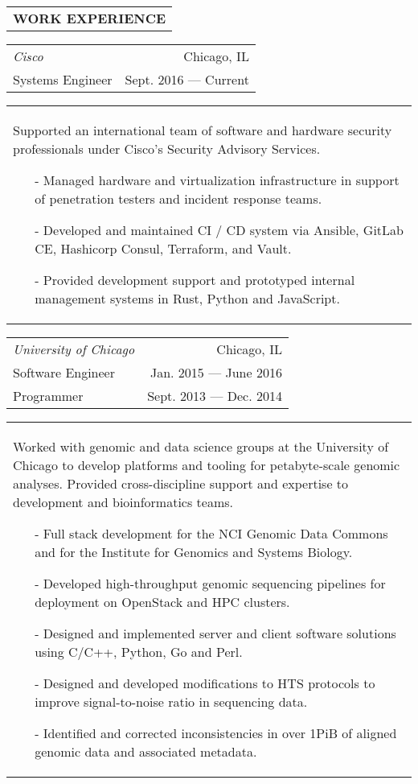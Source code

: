 \begin{tabularx}{\textwidth}{L}
    \textbf{WORK EXPERIENCE}
\end{tabularx}

\begin{tabularx}{\textwidth}{L R}
    \normalsize\textit{Cisco} & Chicago, IL \\
    Systems Engineer & Sept. 2016 --- Current \\
\end{tabularx}
\begin{tabularx}{\textwidth}{X}
    \vspace{1pt}
    Supported an international team of software and hardware security professionals under Cisco's Security Advisory Services.
    \begin{itemize}
        \itemsep{}
        \item[-] Managed hardware and virtualization infrastructure in support of penetration testers and incident response teams.
        \item[-] Developed and maintained CI / CD system via Ansible, GitLab CE, Hashicorp Consul, Terraform, and Vault.
        \item[-] Provided development support and prototyped internal management systems in Rust, Python and JavaScript.
    \end{itemize}
\end{tabularx}

\begin{tabularx}{\textwidth}{L R}
    \normalsize\textit{University of Chicago} & Chicago, IL \\
    Software Engineer & Jan. 2015 --- June 2016 \\
    Programmer & Sept. 2013 --- Dec. 2014 \\
\end{tabularx}
\begin{tabularx}{\textwidth}{X}
    \vspace{1pt}
    Worked with genomic and data science groups at the University of Chicago to develop platforms and tooling for petabyte-scale genomic analyses. Provided cross-discipline support and expertise to development and bioinformatics teams.
    \begin{itemize}
        \itemsep{}
        \item[-] Full stack development for the NCI Genomic Data Commons and for the Institute for Genomics and Systems Biology.
        \item[-] Developed high-throughput genomic sequencing pipelines for deployment on OpenStack and HPC clusters.
        \item[-] Designed and implemented server and client software solutions using C/C++, Python, Go and Perl.
        \item[-] Designed and developed modifications to HTS protocols to improve signal-to-noise ratio in sequencing data.
        \item[-] Identified and corrected inconsistencies in over 1PiB of aligned genomic data and associated metadata.
    \end{itemize}
\end{tabularx}


